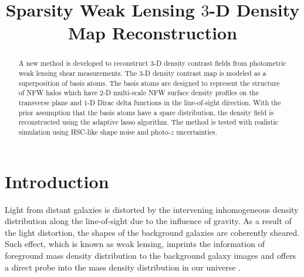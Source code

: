\documentclass[twocolumn]{aastex62}
\newcommand \redColor{\color{red}}
\begin{document}
\title{Sparsity Weak Lensing $3$-D Density Map Reconstruction}

\begin{abstract}
A new method is developed to reconstruct $3$-D density contrast fields from photometric weak lensing shear measurements.
The $3$-D density contrast map is modeled as a superposition of basis atoms. The basis atoms are designed to represent 
the structure of NFW halos which have $2$-D multi-scale NFW surface density profiles on the transverse plane and $1$-D 
Dirac delta functions in the line-of-sight direction. With the prior assumption that the basis atoms have a spare distribution, 
the density field is reconstructed using the adaptive lasso algorithm. The method is tested with realistic simulation 
using HSC-like shape noise and photo-$z$ uncertainties. 
{\redColor{Add descriptions on the outcomes of the test on the simulations.}}
\end{abstract}

\section{Introduction}
Light from distant galaxies is distorted by the intervening inhomogeneous density distribution along the line-of-sight
due to the influence of gravity. As a result of the light distortion, the shapes of the background galaxies are coherently
sheared. Such effect, which is known as weak lensing, imprints the information of foreground mass density distribution
to the background galaxy images and offers a direct probe into the mass density distribution in our universe
\citep[see][for recent reviews]{revKilbinger15,revRachel17}.
\end{document}
